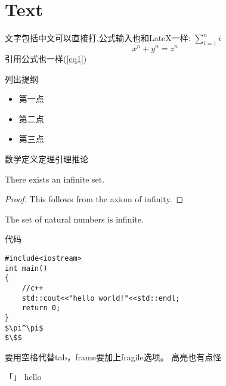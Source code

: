 \section{Text}
\begin{frame}{\secname}
    文字包括中文可以直接打,公式输入也和LateX一样:
    $\sum_{i=1}^n i$\\
    \begin{equation}\label{eq1}
        x^n+y^n=z^n
    \end{equation}
    引用公式也一样(\ref{eq1})
\end{frame}
\begin{frame}{\secname}
    列出提纲 \pause
    \begin{itemize}
        \item 第一点 \pause
        \item 第二点 \pause
        \item 第三点
    \end{itemize}
\end{frame}
\begin{frame}{\secname}
    数学定义定理引理推论
    \begin{definition}
    \end{definition}
    \begin{theorem}
        There exists an infinite set.
    \end{theorem}
    \begin{proof}
        This follows from the axiom of infinity.
    \end{proof}
    \begin{example}
        The set of natural numbers is infinite.
    \end{example}
    \begin{lemma}
    \end{lemma}
\end{frame}
\begin{frame}[fragile]{\secname}
    代码
    \begin{lstlisting}
#include<iostream>
int main()
{
    //c++
    std::cout<<"hello world!"<<std::endl;
    return 0;
}
$\pi^\pi$
$\$$
    \end{lstlisting}
    要用空格代替tab，frame要加上fragile选项。
    高亮也有点怪
\end{frame}
\begin{frame}{「\secname」}
    hello \cite{test1} 
\end{frame}